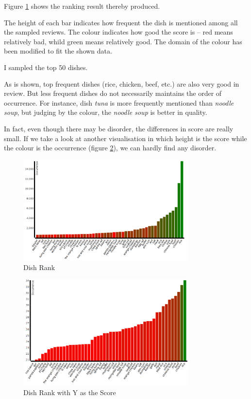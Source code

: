 \documentclass[11pt]{article}
\begin{document}
Figure \ref{fig:dish_rank} shows the ranking result thereby produced.

The height of each bar indicates how frequent the dish is mentioned among all the sampled reviews.
The colour indicates how good the score is -- red means relatively bad, whild green means relatively good. The domain of the colour has been modified to fit the shown data.

I sampled the top 50 dishes.

\vspace{1.5em}
As is shown, top frequent dishes (rice, chicken, beef, etc.) are also very good in review. But less frequent dishes do not necessarily maintains the order of occurrence. For instance, dish \emph{tuna} is more frequently mentioned than \emph{noodle soup}, but judging by the colour, the \emph{noodle soup} is better in quality.

In fact, even though there may be disorder, the differences in score are really small. If we take a look at another visualisation in which height is the score while the colour is the occurrence (figure \ref{fig:dish_rank_1}), we can hardly find any disorder.

\begin{figure}[htp!]
  \centering
  \includegraphics[width=0.8\textwidth]{./img/dish_rank.png}
  \caption{Dish Rank}
  \label{fig:dish_rank}
\end{figure}

\begin{figure}[htp!]
  \centering
  \includegraphics[width=0.8\textwidth]{./img/dish_rank_1.png}
  \caption{Dish Rank with Y as the Score}
  \label{fig:dish_rank_1}
\end{figure}
\end{document}
